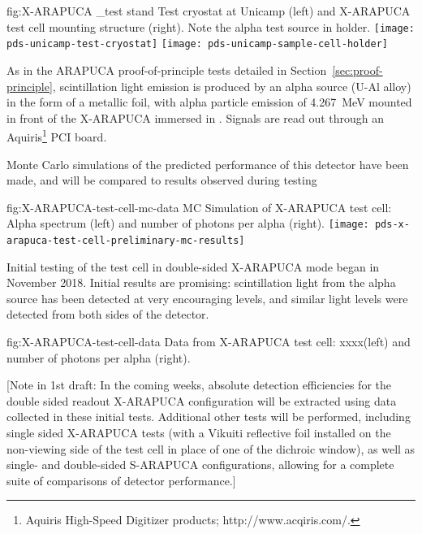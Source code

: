 \begin{dunefigure}{fig:X-ARAPUCA _test stand}
{Test cryostat at Unicamp (left) and X-ARAPUCA test cell mounting structure (right).  Note the alpha test source in holder.} 
	\texttt{[image: pds-unicamp-test-cryostat]} \quad
	\texttt{[image: pds-unicamp-sample-cell-holder]}
\end{dunefigure}  

As in the ARAPUCA proof-of-principle tests detailed in Section~\ref{sec:proof-principle}, scintillation light emission is produced by an alpha source (U-Al alloy) in the form of a metallic foil, with alpha particle emission of \SI{4.267}{MeV} mounted in front of the X-ARAPUCA immersed in \lar. Signals are read out through an Aquiris\footnote{Aquiris High-Speed Digitizer products; http://www.acqiris.com/.} PCI board.

Monte Carlo simulations of the predicted performance of this detector have been made, and will be compared to results observed during testing

\begin{dunefigure}{fig:X-ARAPUCA-test-cell-mc-data}
{MC Simulation of X-ARAPUCA test cell: Alpha spectrum (left) and number of photons per alpha (right).} 
	\texttt{[image: pds-x-arapuca-test-cell-preliminary-mc-results]}
    \vspace{-3cm}
\end{dunefigure}

Initial testing of the test cell in double-sided X-ARAPUCA mode began in November 2018.  Initial results are promising:  scintillation light from the alpha source has been detected at very encouraging levels, and similar light levels were detected from both sides of the detector.


\begin{dunefigure}{fig:X-ARAPUCA-test-cell-data}
{Data from X-ARAPUCA test cell: xxxx(left) and number of photons per alpha (right).} 
\end{dunefigure}


[Note in 1st draft:  In the coming weeks, absolute detection efficiencies for the double sided readout X-ARAPUCA configuration will be extracted using data collected in these initial tests.  Additional other tests will be performed, including single sided X-ARAPUCA tests (with a Vikuiti reflective foil installed on the non-viewing side of the test cell in place of one of the dichroic window), as well as single- and double-sided S-ARAPUCA configurations, allowing for a complete suite of comparisons of detector performance.]




